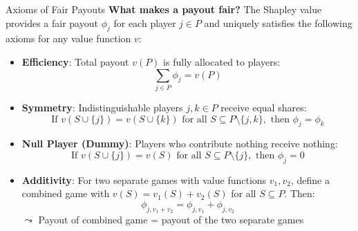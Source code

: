 \documentclass[11pt,compress,t,notes=noshow, aspectratio=169, xcolor=table]{beamer}
\begin{document}
\begin{frame}{Axioms of Fair Payouts}
\textbf{What makes a payout fair?} The Shapley value provides a fair payout $\phi_j$ for each player \( j \in P \) and uniquely satisfies the following axioms for any value function \( v\):

\medskip

\begin{itemize}[<+->]
  \item \textbf{Efficiency}: Total payout $v(P)$ is fully allocated to players:
  \[
  \textstyle \sum_{j \in P} \phi_j = v(P)
  \]

  \item \textbf{Symmetry}: Indistinguishable players $j,k \in P$ receive equal shares:
  \[
  \text{If } v(S \cup \{j\}) = v(S \cup \{k\}) \text{ for all } S \subseteq P \setminus \{j,k\}, \text{ then } \phi_j = \phi_k
  \]

  \item \textbf{Null Player (Dummy)}: Players who contribute nothing receive nothing:
  \[
  \text{If } v(S \cup \{j\}) = v(S) \text{ for all } S \subseteq P \setminus \{j\}, \text{ then } \phi_j = 0
  \]

  \item \textbf{Additivity}: For two separate games with value functions \( v_1, v_2 \), define a combined game with \( v(S) = v_1(S) + v_2(S) \) for all \( S \subseteq P \). Then:
  \[
  \phi_{j, v_1 + v_2} = \phi_{j, v_1} + \phi_{j, v_2}\]
  $\leadsto$ Payout of combined game = payout of the two separate games
\end{itemize}
\end{frame}
\end{document}
